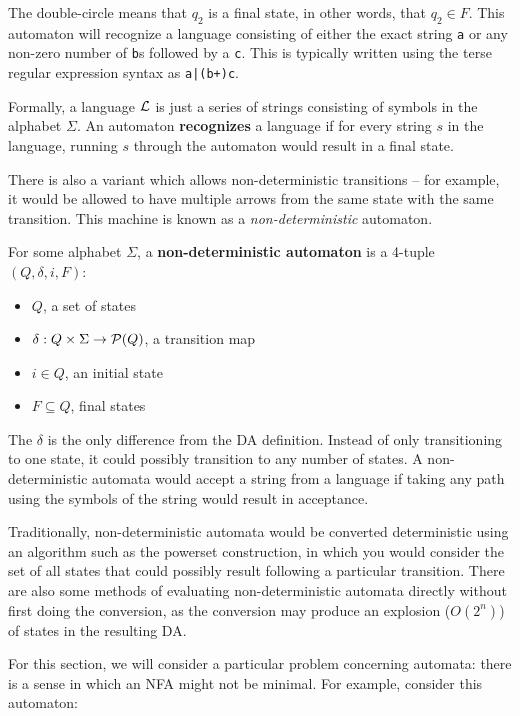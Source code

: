 The double-circle means that $q_2$ is a final state, in other words, that $q_2 \in F$.
This automaton will recognize a language consisting of either the exact string \texttt{a} or any non-zero number of \texttt{b}s followed by a \texttt{c}.
This is typically written using the terse regular expression syntax as \texttt{a|(b+)c}.

Formally, a language $\mathcal L$ is just a series of strings consisting of symbols in the alphabet $\Sigma$.
An automaton \textbf{recognizes} a language if for every string $s$ in the language, running $s$ through the automaton would result in a final state.

There is also a variant which allows non-deterministic transitions -- for example, it would be allowed to have multiple arrows from the same state with the same transition.
This machine is known as a \emph{non-deterministic} automaton.

\begin{definition}
  For some alphabet $\Sigma$, a \textbf{non-deterministic automaton} is a 4-tuple $(Q, \delta, i, F)$:

  \begin{itemize}
    \item $Q$, a set of states
    \item $\delta : Q \times \Sigma \rightarrow \mathcal P(Q)$, a transition map
    \item $i \in Q$, an initial state
    \item $F \subseteq Q$, final states
  \end{itemize}
\end{definition}

The $\delta$ is the only difference from the DA definition.
Instead of only transitioning to one state, it could possibly transition to any number of states.
A non-deterministic automata would accept a string from a language if taking any path using the symbols of the string would result in acceptance.

Traditionally, non-deterministic automata would be converted deterministic using an algorithm such as the powerset construction, in which you would consider the set of all states that could possibly result following a particular transition.
There are also some methods of evaluating non-deterministic automata directly without first doing the conversion, as the conversion may produce an explosion ($O(2^n)$) of states in the resulting DA.

For this section, we will consider a particular problem concerning automata: there is a sense in which an NFA might not be minimal.
For example, consider this automaton:

